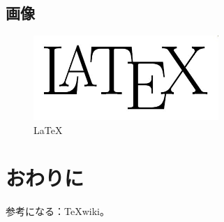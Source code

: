 \documentclass[uplatex]{jsarticle}
\begin{document}
\subsection{画像}
\begin{figure}[htp]
\begin{center}
 \includegraphics[width=7cm]{imgs/latex.jpg}
\end{center}
 \caption{\LaTeX}
 \label{fig:nof}
\end{figure}

\section{おわりに}
参考になる：\TeX wiki\cite{tw}。



\end{document}
